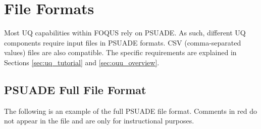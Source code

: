 \section{File Formats}
\label{ap:psuadefiles}

Most UQ capabilities within FOQUS rely on PSUADE. As such, different UQ
components require input files in PSUADE formats. CSV (comma-separated values) files are also compatible. 
The specific requirements are explained in Sections \ref{sec:uq_tutorial} and \ref{sec:ouu_overview}.

\subsection{PSUADE Full File Format}
The following is an example of the full PSUADE file format. Comments in red do not appear in the file and are only for instructional purposes.
 \small
